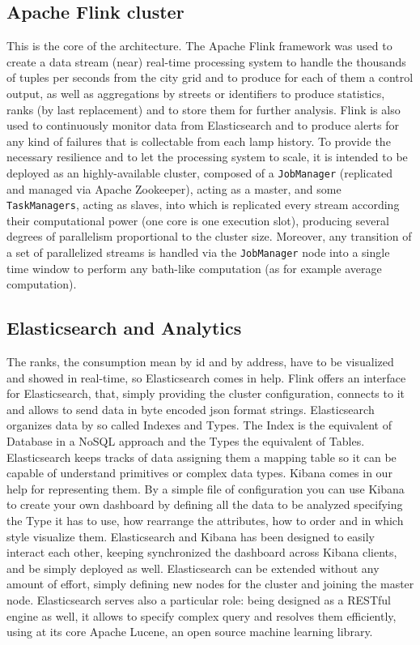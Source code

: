 \subsection{Apache Flink cluster}
This is the core of the architecture. The Apache Flink framework was used to create a data stream (near) real-time processing system to handle the thousands of tuples per seconds from the city grid and to produce for each of them a control output, as well as aggregations by streets or identifiers to produce statistics, ranks (by last replacement) and to store them for further analysis. Flink is also used to continuously monitor data from Elasticsearch and to produce alerts for any kind of failures that is collectable from each lamp history. To provide the necessary resilience and to let the processing system to scale, it is intended to be deployed as an highly-available cluster, composed of a \texttt{JobManager} (replicated and managed via Apache Zookeeper), acting as a master, and some \texttt{TaskManagers}, acting as slaves, into which is replicated every stream according their computational power (one core is one execution slot), producing several degrees of parallelism proportional to the cluster size. Moreover, any transition of a set of parallelized streams is handled via the \texttt{JobManager} node into a single time window to perform any bath-like computation (as for example average computation).

\subsection{Elasticsearch and Analytics}
The ranks, the consumption mean by id and by address, have to be visualized and showed in real-time, so Elasticsearch comes in help. Flink offers an interface for Elasticsearch, that, simply providing the cluster configuration, connects to it and allows to send data in byte encoded json format strings. Elasticsearch organizes data by so called Indexes and Types. The Index is the equivalent of Database in a NoSQL approach and the Types the equivalent of Tables. Elasticsearch keeps tracks of data assigning them a mapping table so it can be capable of understand primitives or complex data types. Kibana comes in our help for representing them. By a simple file of configuration you can use Kibana to create your own dashboard by defining all the data to be analyzed specifying the Type it has to use, how rearrange the attributes, how to order and in which style visualize them. Elasticsearch and Kibana has been designed to easily interact each other, keeping synchronized the dashboard across Kibana clients, and be simply deployed as well. Elasticsearch can be extended without any amount of effort, simply defining new nodes for the cluster and joining the master node. Elasticsearch serves also a particular role: being designed as a RESTful engine as well, it allows to specify complex query and resolves them efficiently, using at its core Apache Lucene, an open source machine learning library.


